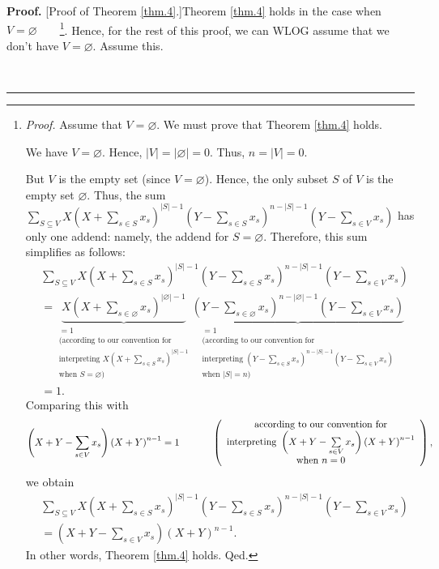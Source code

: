 \documentclass[numbers=enddot,12pt,final,onecolumn,notitlepage]{scrartcl}%
\theoremstyle{definition}
\newenvironment{proof}[1][Proof]{\noindent\textbf{#1.} }{\ \rule{0.5em}{0.5em}}
\let\sumnonlimits\sum
\renewcommand{\sum}{\sumnonlimits\limits}
\newenvironment{verlong}{}{}
\begin{document}
\begin{verlong}
\begin{proof}
[Proof of Theorem \ref{thm.4}.]Theorem \ref{thm.4} holds in the case when
$V=\varnothing$\ \ \ \ \footnote{\textit{Proof.} Assume that $V=\varnothing$.
We must prove that Theorem \ref{thm.4} holds.
\par
We have $V=\varnothing$. Hence, $\left\vert V\right\vert =\left\vert
\varnothing\right\vert =0$. Thus, $n=\left\vert V\right\vert =0$.
\par
But $V$ is the empty set (since $V=\varnothing$). Hence, the only subset $S$
of $V$ is the empty set $\varnothing$. Thus, the sum $\sum_{S\subseteq
V}X\left(  X+\sum_{s\in S}x_{s}\right)  ^{\left\vert S\right\vert -1}\left(
Y-\sum_{s\in S}x_{s}\right)  ^{n-\left\vert S\right\vert -1}\left(
Y-\sum_{s\in V}x_{s}\right)  $ has only one addend: namely, the addend for
$S=\varnothing$. Therefore, this sum simplifies as follows:%
\begin{align*}
&  \sum_{S\subseteq V}X\left(  X+\sum_{s\in S}x_{s}\right)  ^{\left\vert
S\right\vert -1}\left(  Y-\sum_{s\in S}x_{s}\right)  ^{n-\left\vert
S\right\vert -1}\left(  Y-\sum_{s\in V}x_{s}\right) \\
&  =\underbrace{X\left(  X+\sum_{s\in\varnothing}x_{s}\right)  ^{\left\vert
\varnothing\right\vert -1}}_{\substack{=1\\\text{(according to our convention
for}\\\text{interpreting }X\left(  X+\sum_{s\in S}x_{s}\right)  ^{\left\vert
S\right\vert -1}\\\text{when }S=\varnothing\text{)}}}\underbrace{\left(
Y-\sum_{s\in\varnothing}x_{s}\right)  ^{n-\left\vert \varnothing\right\vert
-1}\left(  Y-\sum_{s\in V}x_{s}\right)  }_{\substack{=1\\\text{(according to
our convention for}\\\text{interpreting }\left(  Y-\sum_{s\in S}x_{s}\right)
^{n-\left\vert S\right\vert -1}\left(  Y-\sum_{s\in V}x_{s}\right)
\\\text{when }\left\vert S\right\vert =n\text{)}}}\\
&  =1.
\end{align*}
Comparing this with%
\[
\left(  X+Y-\sum_{s\in V}x_{s}\right)  \left(  X+Y\right)  ^{n-1}%
=1\ \ \ \ \ \ \ \ \ \ \left(
\begin{array}
[c]{c}%
\text{according to our convention for}\\
\text{interpreting }\left(  X+Y-\sum_{s\in V}x_{s}\right)  \left(  X+Y\right)
^{n-1}\\
\text{when }n=0
\end{array}
\right)  ,
\]
we obtain%
\begin{align*}
&  \sum_{S\subseteq V}X\left(  X+\sum_{s\in S}x_{s}\right)  ^{\left\vert
S\right\vert -1}\left(  Y-\sum_{s\in S}x_{s}\right)  ^{n-\left\vert
S\right\vert -1}\left(  Y-\sum_{s\in V}x_{s}\right) \\
&  =\left(  X+Y-\sum_{s\in V}x_{s}\right)  \left(  X+Y\right)  ^{n-1}.
\end{align*}
In other words, Theorem \ref{thm.4} holds. Qed.}. Hence, for the rest of this
proof, we can WLOG assume that we don't have $V=\varnothing$. Assume this.


\end{proof}
\end{verlong}
\end{document}
